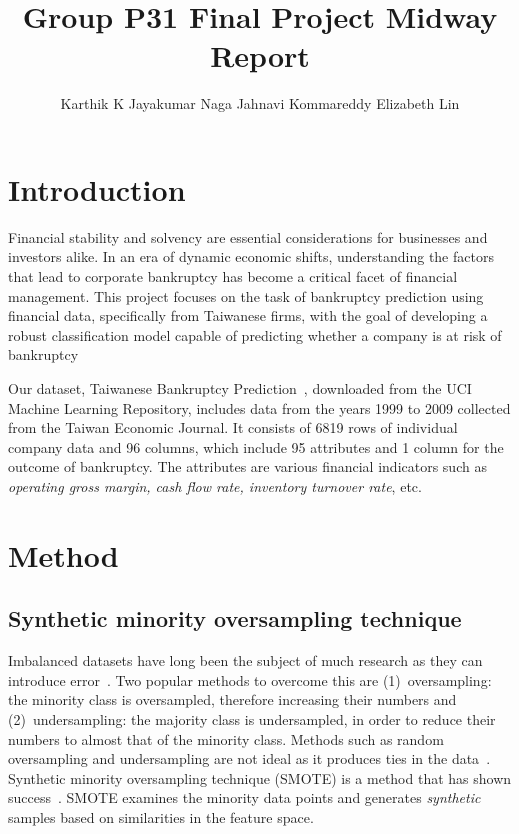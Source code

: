 \documentclass{article}
\title{Group P31 Final Project Midway Report}
\author{%
  Karthik K Jayakumar \And
  Naga Jahnavi Kommareddy \And
  Elizabeth Lin
}
\newcommand\myfillin[1]{\textcolor{blue}{[#1]}}
\begin{document}
\maketitle


\section{Introduction}
\label{sec:introduction}

Financial stability and solvency are essential considerations for businesses and investors alike. In an era of dynamic economic shifts, understanding the factors that lead to corporate bankruptcy has become a critical facet of financial management. This project focuses on the task of bankruptcy prediction using financial data, specifically from Taiwanese firms, with the goal of developing a robust classification model capable of predicting whether a company is at risk of bankruptcy


Our dataset, Taiwanese Bankruptcy Prediction~\cite{misc_taiwanese_bankruptcy_prediction_572}, downloaded from the UCI Machine Learning Repository, includes data from the years 1999 to 2009 collected from the Taiwan Economic Journal.
It consists of 6819 rows of individual company data and 96 columns, which include 95 attributes and 1 column for the outcome of bankruptcy.
The attributes are various financial indicators such as \emph{operating gross margin, cash flow rate, inventory turnover rate}, etc.


\section{Method}
\label{sec:method}

\subsection{Synthetic minority oversampling technique}
\label{ssec:smote}

Imbalanced datasets have long been the subject of much research as they can introduce error~\cite{he2009learning,holte1989concept}.
Two popular methods to overcome this are
(1)~oversampling: the minority class is oversampled, therefore increasing their numbers and
(2)~undersampling: the majority class is undersampled, in order to reduce their numbers to almost that of the minority class.
Methods such as random oversampling and undersampling are not ideal as it produces ties in the data~\cite{mease2007boosted}.
Synthetic minority oversampling technique (SMOTE) is a method that has shown success~\cite{chawla2002smote}.
SMOTE examines the minority data points and generates \emph{synthetic} samples based on similarities in the feature space.
\end{document}
